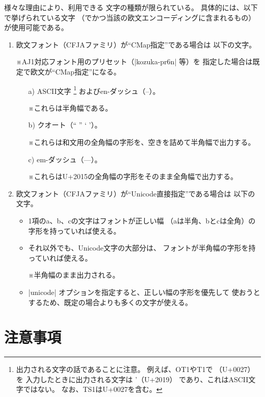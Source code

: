 \documentclass[uplatex,dvipdfmx,a4paper]{jsarticle}
\newcommand{\Note}{\par\noindent ※}
\providecommand{\Strong}[1]{\textsf{#1}}
\begin{document}
様々な理由により、利用できる
文字の種類が限られている。
具体的には、以下で挙げられている文字
（でかつ当該の欧文エンコーディングに含まれるもの）
が使用可能である。
\begin{enumerate}
\item 欧文フォント（CFJAファミリ）が“CMap指定”である場合は
  以下の文字。
  \Note AJ1対応フォント用のプリセット（|kozuka-pr6n| 等）を
  指定した場合は既定で欧文が“CMap指定”になる。
  \begin{itemize}
  \item[a)] ASCII文字
    \footnote{出力される文字の話であることに注意。
      例えば、OT1やT1で \textsf{\textquotesingle}（U+0027）を
      入力したときに出力される文字は \textsf{\textquoteright}（U+2019）
      であり、これはASCII文字ではない。
      なお、TS1はU+0027を含む。}%
    およびen-ダッシュ（\textsf{--}）。
    \Note これらは半角幅である。
  \item[b)] クオート（\textsf{`` '' ` '}）。
    \Note これらは和文用の全角幅の字形を、空きを詰めて半角幅で出力する。
  \item[c)] em-ダッシュ（\textsf{---}）。
    \Note これらはU+2015の全角幅の字形をそのまま全角幅で出力する。
  \end{itemize}
\item 欧文フォント（CFJAファミリ）が“Unicode直接指定”である場合は
  以下の文字。
  \begin{itemize}
  \item 1項のa、b、cの文字はフォントが正しい幅
    （aは\Strong{半角}、bとcは\Strong{全角}）の字形を持っていれば使える。
  \item それ以外でも、Unicode文字の大部分は、
    フォントが\Strong{半角幅}の字形を持っていれば使える。
    \Note 半角幅のまま出力される。
  \item |unicode| オプションを指定すると、正しい幅の字形を優先して
    使おうとするため、既定の場合よりも多くの文字が使える。
  \end{itemize}
\end{enumerate}


\section{注意事項}
\label{sec:Notice}
\end{document}
